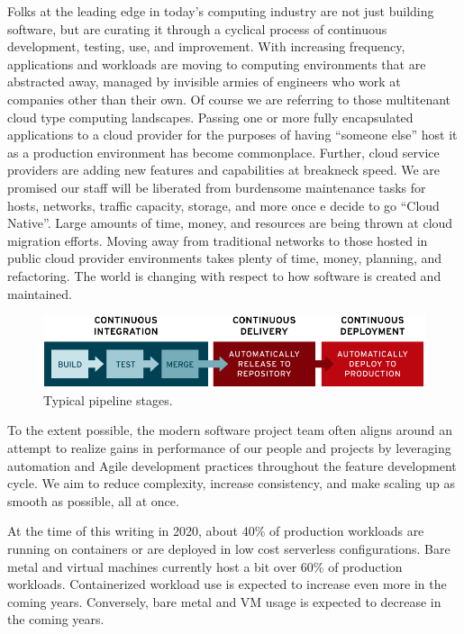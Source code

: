 \justifying
Folks at the leading edge in today's computing industry are not just building
software, but are curating it through a cyclical process of continuous development,
testing, use, and improvement. With increasing frequency, applications and
workloads are moving to computing environments that are abstracted away, managed
by invisible armies of engineers who work at companies other than their own. Of course
we are referring to those multitenant cloud type computing landscapes. Passing
one or more fully encapsulated applications to a cloud provider for the purposes
of having ``someone else'' host it as a production environment has become
commonplace. Further, cloud service providers are adding new features and capabilities
at breakneck speed. We are promised our staff will be liberated from burdensome
maintenance tasks for hosts, networks, traffic capacity, storage, and more once
e decide to go ``Cloud Native''. Large amounts of time,
money, and resources are being thrown at cloud migration efforts. Moving away
from traditional networks to those hosted in public
cloud provider environments takes plenty of time, money, planning, and refactoring.
The world is changing with respect to how software is created and maintained.

\begin{figure}[!htb]
	\centering
	\includegraphics[scale=0.35]{images/ci-cd-flow-desktop_0.png}
	\caption{Typical pipeline stages.}
\label{stages}
\end{figure}

\justifying
To the extent possible, the modern software project team often aligns around an
attempt to realize gains in performance of our people and projects by
leveraging automation and Agile development practices throughout the
feature development cycle. We aim to reduce complexity, increase consistency, and make
scaling up as smooth as possible, all at once.

\justifying
At the time of this writing in 2020, about 40\% of production workloads are
running on containers or are deployed in low cost serverless configurations.
Bare metal and virtual machines currently host a bit over 60\% of production
workloads. Containerized workload use is expected to increase even more in
the coming years. Conversely, bare metal and VM usage is expected to
decrease in the coming years. \cite{cnative}


